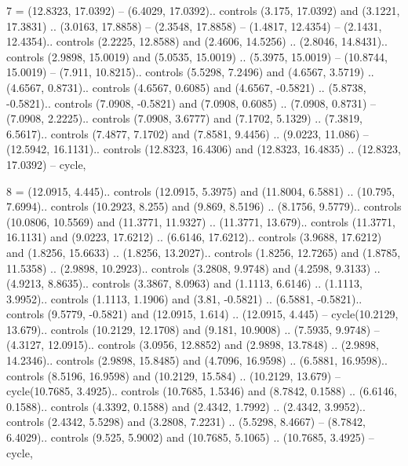 7 = {(12.8323, 17.0392) -- (6.4029, 17.0392).. controls (3.175, 17.0392) and (3.1221, 17.3831) .. (3.0163, 17.8858) -- (2.3548, 17.8858) -- (1.4817, 12.4354) -- (2.1431, 12.4354).. controls (2.2225, 12.8588) and (2.4606, 14.5256) .. (2.8046, 14.8431).. controls (2.9898, 15.0019) and (5.0535, 15.0019) .. (5.3975, 15.0019) -- (10.8744, 15.0019) -- (7.911, 10.8215).. controls (5.5298, 7.2496) and (4.6567, 3.5719) .. (4.6567, 0.8731).. controls (4.6567, 0.6085) and (4.6567, -0.5821) .. (5.8738, -0.5821).. controls (7.0908, -0.5821) and (7.0908, 0.6085) .. (7.0908, 0.8731) -- (7.0908, 2.2225).. controls (7.0908, 3.6777) and (7.1702, 5.1329) .. (7.3819, 6.5617).. controls (7.4877, 7.1702) and (7.8581, 9.4456) .. (9.0223, 11.086) -- (12.5942, 16.1131).. controls (12.8323, 16.4306) and (12.8323, 16.4835) .. (12.8323, 17.0392) -- cycle},

8 = {(12.0915, 4.445).. controls (12.0915, 5.3975) and (11.8004, 6.5881) .. (10.795, 7.6994).. controls (10.2923, 8.255) and (9.869, 8.5196) .. (8.1756, 9.5779).. controls (10.0806, 10.5569) and (11.3771, 11.9327) .. (11.3771, 13.679).. controls (11.3771, 16.1131) and (9.0223, 17.6212) .. (6.6146, 17.6212).. controls (3.9688, 17.6212) and (1.8256, 15.6633) .. (1.8256, 13.2027).. controls (1.8256, 12.7265) and (1.8785, 11.5358) .. (2.9898, 10.2923).. controls (3.2808, 9.9748) and (4.2598, 9.3133) .. (4.9213, 8.8635).. controls (3.3867, 8.0963) and (1.1113, 6.6146) .. (1.1113, 3.9952).. controls (1.1113, 1.1906) and (3.81, -0.5821) .. (6.5881, -0.5821).. controls (9.5779, -0.5821) and (12.0915, 1.614) .. (12.0915, 4.445) -- cycle(10.2129, 13.679).. controls (10.2129, 12.1708) and (9.181, 10.9008) .. (7.5935, 9.9748) -- (4.3127, 12.0915).. controls (3.0956, 12.8852) and (2.9898, 13.7848) .. (2.9898, 14.2346).. controls (2.9898, 15.8485) and (4.7096, 16.9598) .. (6.5881, 16.9598).. controls (8.5196, 16.9598) and (10.2129, 15.584) .. (10.2129, 13.679) -- cycle(10.7685, 3.4925).. controls (10.7685, 1.5346) and (8.7842, 0.1588) .. (6.6146, 0.1588).. controls (4.3392, 0.1588) and (2.4342, 1.7992) .. (2.4342, 3.9952).. controls (2.4342, 5.5298) and (3.2808, 7.2231) .. (5.5298, 8.4667) -- (8.7842, 6.4029).. controls (9.525, 5.9002) and (10.7685, 5.1065) .. (10.7685, 3.4925) -- cycle},

